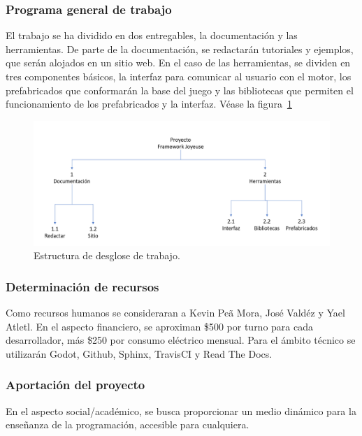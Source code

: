 \documentclass[]{article}
\begin{document}
\subsubsection{Programa general de trabajo}

El trabajo se ha dividido en dos entregables, la documentaci\'on y las herramientas. De parte de la documentaci\'on, se redactar\'an tutoriales y ejemplos, que ser\'an alojados en un sitio web. \newline
En el caso de las herramientas, se dividen en tres componentes b\'asicos, la interfaz para comunicar al usuario con el motor, los prefabricados que conformar\'an la base del juego y las bibliotecas que permiten el funcionamiento de los prefabricados y la interfaz. V\'ease la figura~\ref{EDT2}

\begin{figure}[H]
	
	\centering
	\includegraphics[width=1\textwidth]{EDT}
	\caption{Estructura de desglose de trabajo.} 
	\label{EDT2}
	
\end{figure}
\subsubsection{Determinaci\'on de recursos}
Como recursos humanos se consideraran a Kevin Pe\~a Mora, Jos\'e Vald\'ez y Yael Atletl. En el aspecto financiero, se aproximan \$500 por turno para cada desarrollador, m\'as \$250 por consumo el\'ectrico mensual. 
Para el \'ambito t\'ecnico se utilizar\'an Godot, Github, Sphinx, TravisCI y Read The Docs.

\subsubsection{Aportaci\'on del proyecto}
En el aspecto social/acad\'emico, se busca proporcionar un medio din\'amico para la ense\~nanza de la programaci\'on, accesible para cualquiera. 
\end{document}
